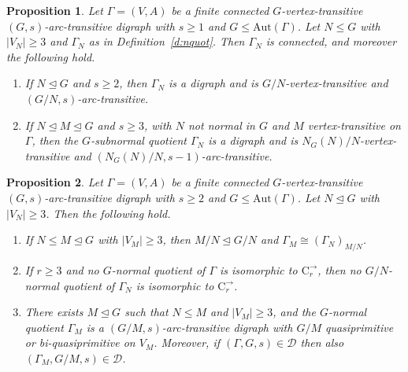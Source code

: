 \documentclass[10pt,a4paper]{amsart}
\newtheorem{proposition}{Proposition}
\newcommand{\Aut}{\mathrm{Aut}}
\newcommand{\C}{{\mathrm{C}}}
\newcommand\DD{{\mathscr{D}}}
\begin{document}
\begin{proposition}\label{p:quot}
   Let \(\Gamma=(V,A)\) be a finite connected $G$-vertex-transitive  \((G,s)\)-arc-transitive digraph with \(s\geqslant1\) and $G\leq\Aut(\Gamma)$. Let $N\leq G$ with $|V_N|\geq3$ and $\Gamma_N$ as in Definition~\ref{d:nquot}. Then $\Gamma_N$ is connected, and moreover the following hold.
   \begin{enumerate}
       \item[(a)] If $N\unlhd G$ and  \(s\geqslant2\), then $\Gamma_N$ is a digraph and is $G/N$-vertex-transitive and $(G/N,s)$-arc-transitive. 
       \item[(b)] If $N\unlhd M\unlhd G$ and  \(s\geqslant3\), with $N$ not normal in $G$ and $M$ vertex-transitive on $\Gamma$, then the $G$-subnormal quotient $\Gamma_N$ is a digraph and is $N_G(N)/N$-vertex-transitive and  $(N_G(N)/N,s-1)$-arc-transitive. 
   \end{enumerate} 
\end{proposition}

\begin{proposition}\label{p:quot2}
   Let \(\Gamma=(V,A)\) be a finite connected $G$-vertex-transitive \((G,s)\)-arc-transitive digraph with \(s\geqslant2\) and $G\leq\Aut(\Gamma)$. Let $N\unlhd G$ with $|V_N|\geq3$. Then the following hold.
   \begin{enumerate}
       \item[(a)] If  $N\leqslant M\unlhd G$ with $|V_M|\geqslant3$, then $M/N\unlhd G/N$ and $\Gamma_M\cong (\Gamma_N)_{M/N}$.
       \item[(b)] If $r\geqslant3$ and no $G$-normal quotient of $\Gamma$ is isomorphic to $\C^{\to}_r$, then  no $G/N$-normal quotient of $\Gamma_N$ is isomorphic to $\C^{\to}_r$.
       \item[(c)] There exists $M\unlhd G$ such that $N\leqslant M$ and $|V_M|\geqslant3$, and the $G$-normal quotient $\Gamma_M$ is a $(G/M,s)$-arc-transitive digraph with $G/M$ quasiprimitive or bi-quasiprimitive on $V_M$. Moreover, if $(\Gamma, G, s)\in\DD$ then also $(\Gamma_M, G/M, s)\in\DD$.
   \end{enumerate}
\end{proposition}
\end{document}
